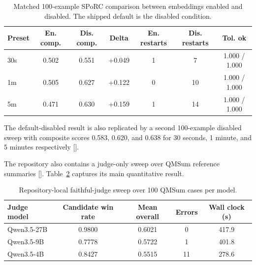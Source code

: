 \begin{table}[H]
\centering
\footnotesize
\begin{tabular}{lcccccc}
\toprule
Preset & En. comp. & Dis. comp. & Delta & En. restarts & Dis. restarts & Tol. ok \\
\midrule
30s & 0.502 & 0.551 & +0.049 & 1 & 7 & 1.000 / 1.000 \\
1m & 0.505 & 0.627 & +0.122 & 0 & 10 & 1.000 / 1.000 \\
5m & 0.471 & 0.630 & +0.159 & 1 & 14 & 1.000 / 1.000 \\
\bottomrule
\end{tabular}
\caption{Matched 100-example SPoRC comparison between embeddings enabled and disabled. The shipped default is the disabled condition.}
\label{tab:embedding-compare}
\end{table}

The default-disabled result is also replicated by a second 100-example disabled sweep with composite scores 0.583, 0.620, and 0.638 for 30 seconds, 1 minute, and 5 minutes respectively [\cite{internal_sporc_duration_sweep_disabled_20260320b}].

The repository also contains a judge-only sweep over QMSum reference summaries [\cite{internal_faithful_judge_sweep_20260313}]. Table~\ref{tab:judge-sweep} captures its main quantitative result.

\begin{table}[H]
\centering
\small
\begin{tabular}{lcccc}
\toprule
Judge model & Candidate win rate & Mean overall & Errors & Wall clock (s) \\
\midrule
Qwen3.5-27B & 0.9800 & 0.6021 & 0 & 417.9 \\
Qwen3.5-9B & 0.7778 & 0.5722 & 1 & 401.8 \\
Qwen3.5-4B & 0.8427 & 0.5515 & 11 & 278.6 \\
\bottomrule
\end{tabular}
\caption{Repository-local faithful-judge sweep over 100 QMSum cases per model.}
\label{tab:judge-sweep}
\end{table}

